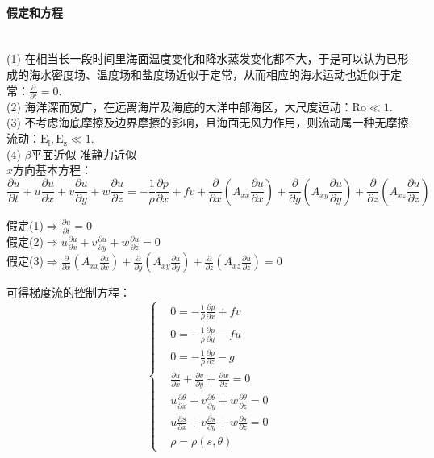 \documentclass[a4paper,12pt]{article}
\begin{document}
    \paragraph{假定和方程}~{} \\
    (1) 在相当长一段时间里海面温度变化和降水蒸发变化都不大，于是可以认为已形成的海水密度场、温度场和盐度场近似于定常，从而相应的海水运动也近似于定常：$\displaystyle \frac{\partial }{\partial t}=0$.\\
    (2) 海洋深而宽广，在远离海岸及海底的大洋中部海区，大尺度运动：$\displaystyle \mathrm{Ro}\ll 1$.\\
    (3) 不考虑海底摩擦及边界摩擦的影响，且海面无风力作用，则流动属一种无摩擦流动：$\displaystyle \mathrm{E_l,E_z \ll 1}$.\\
    (4) $\beta$平面近似 准静力近似\\
    $x$方向基本方程：
    \[
        \frac{\partial {u}}{\partial t}+{u} \frac{\partial {u}}{\partial {x}}+{v} \frac{\partial {u}}{\partial {y}}+{w} \frac{\partial {u}}{\partial z}=-\frac{1}{\rho} \frac{\partial {p}}{\partial {x}}+{f} {v}+\frac{\partial}{\partial {x}}\left({A}_{x x} \frac{\partial {u}}{\partial {x}}\right)+\frac{\partial}{\partial {y}}\left({A}_{x y} \frac{\partial {u}}{\partial {y}}\right)+\frac{\partial}{\partial z}\left({A}_{x z} \frac{\partial {u}}{\partial z}\right)
    \]
    \begin{spacing}{2.5}
        假定(1)$\Rightarrow\displaystyle\frac{\partial {u}}{\partial t}=0$\\
        假定(2)$\Rightarrow\displaystyle{u}\frac{\partial {u}}{\partial {x}}+{v} \frac{\partial {u}}{\partial{y}}+{w}\frac{\partial{u}}{\partial z}=0$\\
        假定(3)$\Rightarrow\displaystyle\frac{\partial}{\partial {x}}\left({A}_{x x} \frac{\partial {u}}{\partial {x}}\right)+\frac{\partial}{\partial {y}}\left({A}_{x y} \frac{\partial {u}}{\partial {y}}\right)+\frac{\partial}{\partial z}\left({A}_{x z} \frac{\partial {u}}{\partial z}\right)=0$
    \end{spacing}
    可得梯度流的控制方程：
    \[
        \left\{\begin{aligned}&0=-\frac{1}{\rho} \frac{\partial p}{\partial x}+f v \\ &0=-\frac{1}{\rho} \frac{\partial p}{\partial y}-f u \\ &0=-\frac{1}{\rho} \frac{\partial p}{\partial z}-g \\ &\frac{\partial u}{\partial x}+\frac{\partial v}{\partial y}+\frac{\partial w}{\partial z}=0 \\ &u \frac{\partial \theta}{\partial x}+v \frac{\partial \theta}{\partial y}+w \frac{\partial \theta}{\partial z}=0 \\ &u \frac{\partial s}{\partial x}+v \frac{\partial s}{\partial y}+w \frac{\partial s}{\partial z}=0 \\& \rho=\rho(s, \theta)\end{aligned}\right.
    \]
\end{document}

